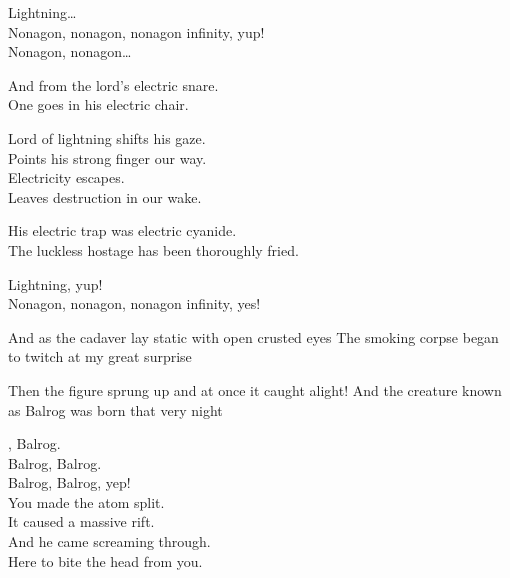 Lightning… \\

Nonagon, nonagon, nonagon infinity, yup! \\
Nonagon, nonagon… \\


And from the lord's electric snare. \\
One goes in his electric chair. \\


Lord of lightning shifts his gaze. \\
Points his strong finger our way. \\
Electricity escapes. \\
Leaves destruction in our wake. \\


His electric trap was electric cyanide. \\
The luckless hostage has been thoroughly fried. \\


Lightning, yup! \\

Nonagon, nonagon, nonagon infinity, yes! \\


And as the cadaver lay static with open crusted eyes
The smoking corpse began to twitch at my great surprise

Then the figure sprung up and at once it caught alight!
And the creature known as Balrog was born that very night 





, Balrog. \\
Balrog, Balrog. \\
Balrog, Balrog, yep! \\

You made the atom split. \\
It caused a massive rift. \\
And he came screaming through. \\
Here to bite the head from you. \\

